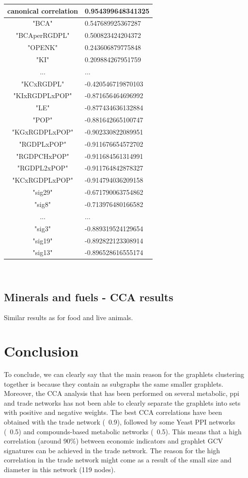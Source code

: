 \documentclass[11pt,a4paper,oneside]{report}
\begin{document}
\begin{tabular}{ c | l }
canonical correlation &  0.954399648341325\\
\hline
"BCA" & 0.547689925367287\\
"BCAperRGDPL" & 0.500823424204372\\
"OPENK" & 0.243606879775848\\
"KI" & 0.209884267951759\\
... & ...\\
"KCxRGDPL" & -0.420546719870103\\
"KIxRGDPLxPOP" & -0.871656464696992\\
"LE" & -0.877434636132884\\
"POP" & -0.881642665100747\\
"KGxRGDPLxPOP" & -0.902330822089951\\
"RGDPLxPOP" & -0.911676654572702\\
"RGDPCHxPOP" & -0.911684561314991\\
"RGDPL2xPOP" & -0.911764842878327\\
"KCxRGDPLxPOP" & -0.914794036209158\\
\hline
"sig29"  & -0.671790063754862\\
"sig8" & -0.713976480166582\\
... & ...\\
"sig3" & -0.889319524129654\\
"sig19" & -0.892822123308914\\
"sig13" & -0.896528616555174\\
\end{tabular}\\


\subsection*{Minerals and fuels - CCA results}

Similar results as for food and live animals.


\section*{Conclusion}  
  To conclude, we can clearly say that the main reason for the graphlets clustering together is because they contain as subgraphs the same smaller graphlets. Moreover, the CCA analysis that has been performed on several metabolic, ppi and trade networks has not been able to clearly separate the graphlets into sets with positive and negative weights. The best CCA correlations have been obtained with the trade network (~0.9), followed by some Yeast PPI networks (~0.5) and compounds-based metabolic networks (~0.5). This means that a high correlation (around 90\%) between economic indicators and graphlet GCV signatures can be achieved in the trade network. The reason for the high correlation in the trade network might come as a result of the small size and diameter in this network (119 nodes). 
  
\end{document}
